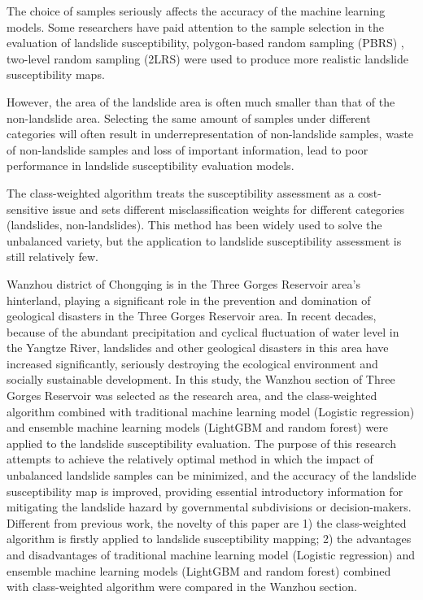 \documentclass[a4paper,fleqn]{cas-sc}
\begin{document}
The choice of samples seriously affects the accuracy of the machine learning models. 
Some researchers have paid attention to the sample selection in the evaluation of landslide susceptibility, polygon-based random sampling (PBRS) \citep{San2014IJoAEOaG}, two-level random sampling (2LRS) \citep{Ada2017NH, Aktas2019C&G} were used to produce more realistic landslide susceptibility maps.

However, the area of the landslide area is often much smaller than that of the non-landslide area. 
Selecting the same amount of samples under different categories will often result in underrepresentation of non-landslide samples, waste of non-landslide samples and loss of important information, lead to poor performance in landslide susceptibility evaluation models.

The class-weighted algorithm treats the susceptibility assessment as a cost-sensitive issue and sets different misclassification weights for different categories (landslides, non-landslides). 
This method has been widely used to solve the unbalanced variety, but the application to landslide susceptibility assessment is still relatively few.



Wanzhou district of Chongqing is in the Three Gorges Reservoir area's hinterland, playing a significant role in the prevention and domination of geological disasters in the Three Gorges Reservoir area. 
In recent decades, because of the abundant precipitation and cyclical fluctuation of water level in the Yangtze River, landslides and other geological disasters in this area have increased significantly, seriously destroying the ecological environment and socially sustainable development. 
In this study, the Wanzhou section of Three Gorges Reservoir was selected as the research area, and the class-weighted algorithm combined with traditional machine learning model (Logistic regression) and ensemble machine learning models (LightGBM and random forest) were applied to the landslide susceptibility evaluation. 
The purpose of this research attempts to achieve the relatively optimal method in which the impact of unbalanced landslide samples can be minimized, and the accuracy of the landslide susceptibility map is improved, providing essential introductory information for mitigating the landslide hazard by governmental subdivisions or decision-makers. 
Different from previous work, the novelty of this paper are 1) the class-weighted algorithm is firstly applied to landslide susceptibility mapping; 2) the advantages and disadvantages of traditional machine learning model (Logistic regression) and ensemble machine learning models (LightGBM and random forest) combined with class-weighted algorithm were compared in the Wanzhou section.
\end{document}

